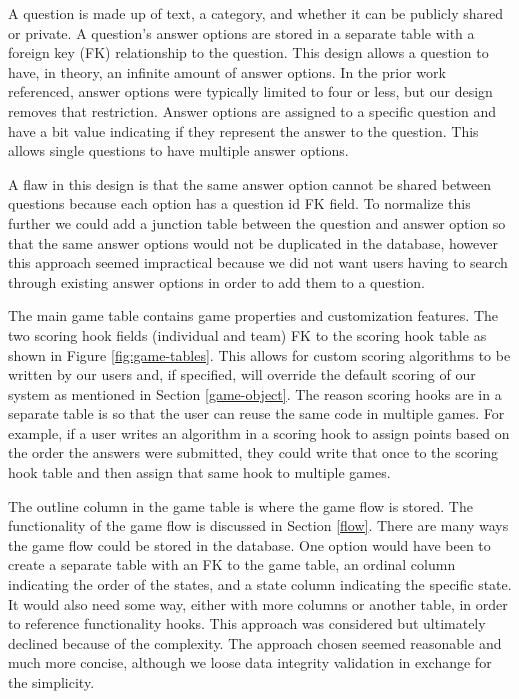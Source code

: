 \documentclass{article}
\begin{document}
    		A question is made up of text, a category, and whether it can be publicly shared or private. A question's answer options are stored in a separate table with a foreign key (FK) relationship to the question. This design allows a question to have, in theory, an infinite amount of answer options. In the prior work referenced, answer options were typically limited to four or less, but our design removes that restriction. Answer options are assigned to a specific question and have a bit value indicating if they represent the answer to the question. This allows single questions to have multiple answer options.
    		\smallskip
    		
    		A flaw in this design is that the same answer option cannot be shared between questions because each option has a question id FK field.  To normalize this further we could add a junction table between the question and answer option so that the same answer options would not be duplicated in the database, however this approach seemed impractical because we did not want users having to search through existing answer options in order to add them to a question.
    		\smallskip
    		
    		The main game table contains game properties and customization features. The two scoring hook fields (individual and team) FK to the scoring hook table as shown in Figure \ref{fig:game-tables}. This allows for custom scoring algorithms to be written by our users and, if specified, will override the default scoring of our system as mentioned in Section \ref{game-object}. The reason scoring hooks are in a separate table is so that the user can reuse the same code in multiple games. For example, if a user writes an algorithm in a scoring hook to assign points based on the order the answers were submitted, they could write that once to the scoring hook table and then assign that same hook to multiple games.
    		\smallskip
    		
    		The outline column in the game table is where the game flow is stored. The functionality of the game flow is discussed in Section \ref{flow}. There are many ways the game flow could be stored in the database. One option would have been to create a separate table with an FK to the game table, an ordinal column indicating the order of the states, and a state column indicating the specific state. It would also need some way, either with more columns or another table, in order to reference functionality hooks. This approach was considered but ultimately declined because of the complexity. The approach chosen seemed reasonable and much more concise, although we loose data integrity validation in exchange for the simplicity.
    		\smallskip
    		
\end{document}
